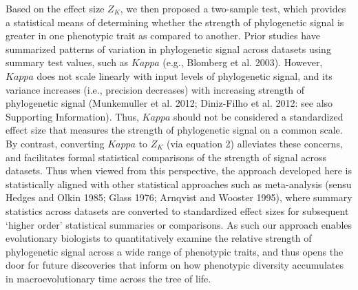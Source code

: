 \documentclass[
]{article}
\begin{document}
Based on the effect size \(Z_K\), we then proposed a two-sample test,
which provides a statistical means of determining whether the strength
of phylogenetic signal is greater in one phenotypic trait as compared to
another. Prior studies have summarized patterns of variation in
phylogenetic signal across datasets using summary test values, such as
\(Kappa\) (e.g., Blomberg et al. 2003). However, \(Kappa\) does not
scale linearly with input levels of phylogenetic signal, and its
variance increases (i.e., precision decreases) with increasing strength
of phylogenetic signal (Munkemuller et al. 2012; Diniz-Filho et al.
2012: see also Supporting Information). Thus, \(Kappa\) should not be
considered a standardized effect size that measures the strength of
phylogenetic signal on a common scale. By contrast, converting \(Kappa\)
to \(Z_K\) (via equation 2) alleviates these concerns, and facilitates
formal statistical comparisons of the strength of signal across
datasets. Thus when viewed from this perspective, the approach developed
here is statistically aligned with other statistical approaches such as
meta-analysis (sensu Hedges and Olkin 1985; Glass 1976; Arnqvist and
Wooster 1995), where summary statistics across datasets are converted to
standardized effect sizes for subsequent `higher order' statistical
summaries or comparisons. As such our approach enables evolutionary
biologists to quantitatively examine the relative strength of
phylogenetic signal across a wide range of phenotypic traits, and thus
opens the door for future discoveries that inform on how phenotypic
diversity accumulates in macroevolutionary time across the tree of life.
\hfill\break
\end{document}
